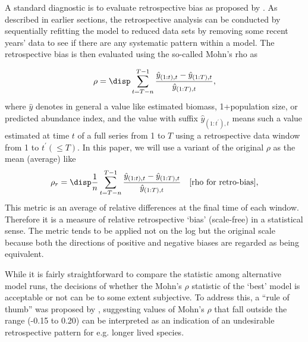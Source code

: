 A standard diagnostic is to evaluate retrospective bias as proposed by \cite{mohn1999retrospectyive}. As described in earlier sections, the retrospective analysis can be conducted by sequentially refitting the model to reduced data sets by removing some recent years' data to see if there are any systematic pattern within a model. The retrospective bias is then evaluated using the so-called Mohn's rho as 

\[
\rho = \disp \sum_{t=T-n}^{T-1} \frac{\hat{y}_{(1:t),t}-\hat{y}_{(1:T),t}}{\hat{y}_{(1:T),t}}, 
\]
where $\hat{y}$ denotes in general a value like estimated biomass, 1+population size, or predicted abundance index, and the value with suffix $\hat{y}_{(1:t^\prime),t}$ means such a value estimated at time $t$ of a full series from 1 to $T$ using a retrospective data window from 1 to $t^\prime (\leq T)$. In this paper, we will use a variant of the original $\rho$ as the mean (average) like 
\begin{equation}
\rho_r = \disp \frac{1}{n} \sum_{t=T-n}^{T-1} \frac{\hat{y}_{(1:t),t}-\hat{y}_{(1:T),t}}{\hat{y}_{(1:T),t}} 
\quad \mbox{[rho for retro-bias]}, 
\end{equation}
This metric is an average of relative differences at the final time of each window. Therefore it is a measure of relative retrospective `bias' (scale-free) in a statistical sense. The metric tends to be applied not on the log but the original scale because both the directions of positive and negative biases are regarded as being equivalent. 

While it is fairly straightforward to compare the  statistic among alternative model runs, the decisions of whether the Mohn’s $\rho$ statistic of the ‘best’ model is acceptable or not can be to some extent subjective. To address this, a “rule of thumb” was proposed by \cite{hurtado2014}, suggesting values of Mohn’s $\rho$ that fall outside the range (-0.15 to 0.20) can be interpreted as an indication of an undesirable retrospective pattern for e.g. longer lived species.

